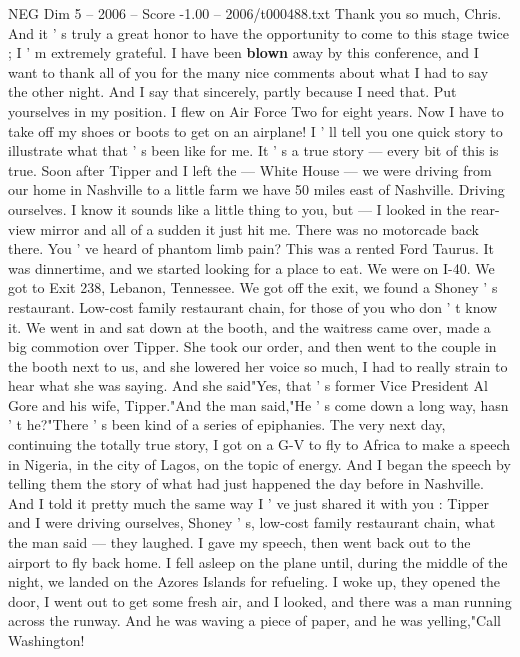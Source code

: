 \begin{textsample}{NEG Dim 5 – 2006 – Score -1.00 – 2006/t000488.txt}  \label{ex:f5_neg_061}
Thank you so much, Chris.
And it ' s truly a great honor to have the opportunity to come to this stage twice ; I ' m extremely grateful.
I have been \textbf{blown} away by this conference, and I want to thank all of you for the many nice comments about what I had to say the other night.
And I say that sincerely, partly because I need that.
Put yourselves in my position.
I flew on Air Force Two for eight years.
Now I have to take off my shoes or boots to get on an airplane!
I ' ll tell you one quick story to illustrate what that ' s been like for me.
It ' s a true story — every bit of this is true.
Soon after Tipper and I left the — White House — we were driving from our home in Nashville to a little farm we have 50 miles east of Nashville.
Driving ourselves.
I know it sounds like a little thing to you, but — I looked in the rear-view mirror and all of a sudden it just hit me.
There was no motorcade back there.
You ' ve heard of phantom limb pain?
This was a rented Ford Taurus.
It was dinnertime, and we started looking for a place to eat.
We were on I-40.
We got to Exit 238, Lebanon, Tennessee.
We got off the exit, we found a Shoney ' s restaurant.
Low-cost family restaurant chain, for those of you who don ' t know it.
We went in and sat down at the booth, and the waitress came over, made a big commotion over Tipper.
She took our order, and then went to the couple in the booth next to us, and she lowered her voice so much, I had to really strain to hear what she was saying.
And she said"Yes, that ' s former Vice President Al Gore and his wife, Tipper."And the man said,"He ' s come down a long way, hasn ' t he?"There ' s been kind of a series of epiphanies.
The very next day, continuing the totally true story, I got on a G-V to fly to Africa to make a speech in Nigeria, in the city of Lagos, on the topic of energy.
And I began the speech by telling them the story of what had just happened the day before in Nashville.
And I told it pretty much the same way I ' ve just shared it with you : Tipper and I were driving ourselves, Shoney ' s, low-cost family restaurant chain, what the man said — they laughed.
I gave my speech, then went back out to the airport to fly back home.
I fell asleep on the plane until, during the middle of the night, we landed on the Azores Islands for refueling.
I woke up, they opened the door, I went out to get some fresh air, and I looked, and there was a man running across the runway.
And he was waving a piece of paper, and he was yelling,"Call Washington!

\end{textsample}
